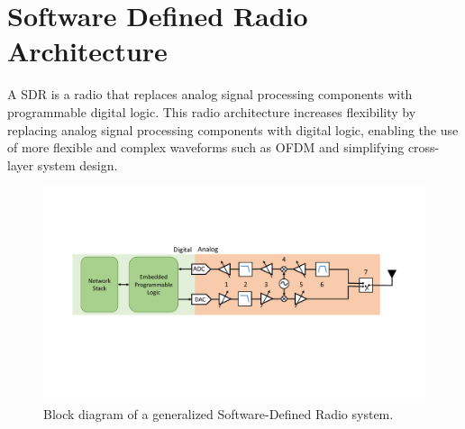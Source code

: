 \section{Software Defined Radio Architecture}
\label{sec_sdr_back}

A \acf{SDR} is a radio that replaces analog signal processing components with programmable digital logic.
This radio architecture increases flexibility by replacing analog signal processing components with digital logic, enabling the use of more flexible and complex waveforms such as \ac{OFDM} and simplifying cross-layer system design.

\begin{figure}[ht] %
\centering
\includegraphics[width=1\linewidth]{./figs/agc/generic_sdr}
\caption{Block diagram of a generalized Software-Defined Radio system.}
\label{fig_sdr_ideal}
\end{figure}

